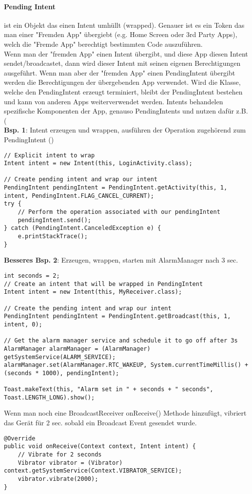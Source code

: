 \paragraph{Pending Intent} ist ein Objekt das einen Intent umhüllt (wrapped). Genauer ist es ein Token das man einer "{}Fremden App"{} übergiebt (e.g.  Home Screen  oder 3rd Party Apps), welch die "Fremde App" berechtigt bestimmten Code auszuführen. \\
Wenn man der "{}fremden App"{} einen Intent übergibt, und diese App diesen Intent sendet/broadcastet, dann wird dieser Intent mit seinen eigenen Berechtigungen ausgeführt. Wenn man aber der "fremden App" einen PendingIntent übergibt werden die Berechtigungen der übergebenden App verwendet. Wird die Klasse, welche den PendingIntent erzeugt terminiert, bleibt der PendingIntent bestehen und kann von anderen Apps weiterverwendet werden. Intents behandelen spezifische Komponenten der App, genauso PendingIntents und nutzen dafür z.B. ( \\
\textbf{Bsp. 1}: Intent erzeugen und wrappen, ausführen der Operation zugehörend zum PendingIntent ()
\begin{lstlisting}
// Explicit intent to wrap
Intent intent = new Intent(this, LoginActivity.class);

// Create pending intent and wrap our intent
PendingIntent pendingIntent = PendingIntent.getActivity(this, 1, intent, PendingIntent.FLAG_CANCEL_CURRENT);
try {
    // Perform the operation associated with our pendingIntent
    pendingIntent.send();
} catch (PendingIntent.CanceledException e) {
    e.printStackTrace();
}
\end{lstlisting}
\textbf{Besseres Bsp. 2}: Erzeugen, wrappen, starten mit AlarmManager nach 3 sec.
\begin{lstlisting}
int seconds = 2;
// Create an intent that will be wrapped in PendingIntent
Intent intent = new Intent(this, MyReceiver.class);

// Create the pending intent and wrap our intent
PendingIntent pendingIntent = PendingIntent.getBroadcast(this, 1, intent, 0);

// Get the alarm manager service and schedule it to go off after 3s
AlarmManager alarmManager = (AlarmManager) getSystemService(ALARM_SERVICE);
alarmManager.set(AlarmManager.RTC_WAKEUP, System.currentTimeMillis() + (seconds * 1000), pendingIntent);

Toast.makeText(this, "Alarm set in " + seconds + " seconds", Toast.LENGTH_LONG).show();
\end{lstlisting}
Wenn man noch eine BroadcastReceiver onReceive() Methode hinzufügt, vibriert das Gerät für 2 sec. sobald ein Broadcast Event gesendet wurde.
\begin{lstlisting}
@Override
public void onReceive(Context context, Intent intent) {
    // Vibrate for 2 seconds
    Vibrator vibrator = (Vibrator) context.getSystemService(Context.VIBRATOR_SERVICE);
    vibrator.vibrate(2000);
}
\end{lstlisting}

